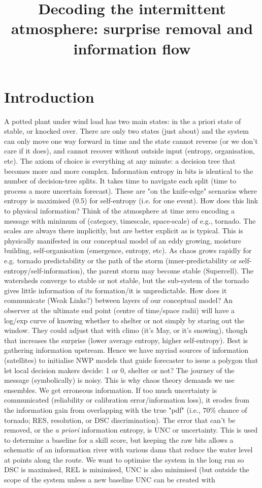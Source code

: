 \documentclass[draft]{ametsoc}
\title{Decoding the intermittent atmosphere: surprise removal and information flow}
\affiliation{Cooperative for Mesoscale Meteorological Studies, University of Oklahoma, OK, USA \\ NOAA/OAR/National Severe Storms Laboratory, OK, USA \\ Valparaiso University, Indiana, USA}
\begin{document}
\maketitle

\section{Introduction}
A potted plant under wind load has two main states: in the a priori state of stable, or knocked over. There are only two states (just about) and the system can only move one way forward in time and the state cannot reverse (or we don't care if it does), and cannot recover without outside input (entropy, organisation, etc). The axiom of choice is everything at any minute: a decision tree that becomes more and more complex. Information entropy in bits is identical to the number of decision-tree splits. It takes time to navigate each split (time to process a more uncertain forecast). These are "on the knife-edge" scenarios where entropy is maximised (0.5) for self-entropy (i.e. for one event). How does this link to physical information? Think of the atmosphere at time zero encoding a message with minimum of (category, timescale, space-scale) of e.g., tornado. The scales are always there implicitly, but are better explicit as is typical. This is physically manifested in our conceptual model of an eddy growing, moisture building, self-organisation (emergence, entropy, etc). As chaos grows rapidly for e.g. tornado predictability or the path of the storm (inner-predictability or self-entropy/self-information), the parent storm may become stable (Supercell). The watersheds converge to stable or not stable, but the sub-system of the tornado gives little information of its formation/it is unpredictable. How does it communicate (Weak Links?) between layers of our conceptual model? An observer at the ultimate end point (centre of time/space radii) will have a log/exp curve of knowing whether to shelter or not simply by staring out the window. They could adjust that with climo (it's May, or it's snowing), though that increases the surprise (lower average entropy, higher self-entropy). Best is gathering information upstream. Hence we have myriad sources of information (satellites) to initialise NWP models that guide forecaster to issue a polygon that let local decision makers decide: 1 or 0, shelter or not? The journey of the message (symbolically) is noisy. This is why chaos theory demands we use ensembles. We get erroneous information. If too much uncertainty is communicated (reliability or calibration error/information loss), it erodes from the information gain from overlapping with the true "pdf" (i.e., 70\% chance of tornado; RES, resolution, or DSC discrimination). The error that can't be removed, or the \emph{a priori} information entropy, is UNC or uncertainty. This is used to determine a baseline for a skill score, but keeping the raw bits allows a schematic of an information river with various dams that reduce the water level at points along the route. We want to optimise the system in the long run so DSC is maximised, REL is minimised, UNC is also minimised (but outside the scope of the system unless a new baseline UNC can be created with 
\end{document}
